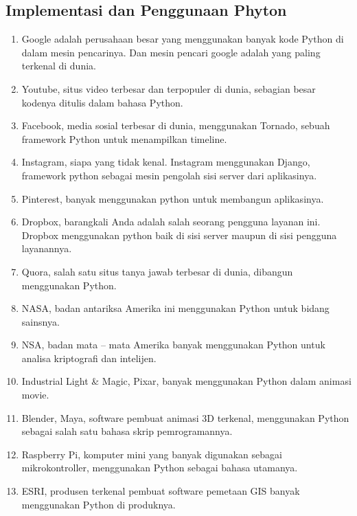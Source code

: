 \documentclass{article}
\begin{document}
\subsection{Implementasi dan Penggunaan Phyton}
\begin{enumerate}
\item
Google adalah perusahaan besar yang menggunakan banyak kode Python di dalam mesin pencarinya. Dan mesin pencari google adalah yang paling terkenal di dunia.
\item
Youtube, situs video terbesar dan terpopuler di dunia, sebagian besar kodenya ditulis dalam bahasa Python.
\item
Facebook, media sosial terbesar di dunia, menggunakan Tornado, sebuah framework Python untuk menampilkan timeline.
\item
Instagram, siapa yang tidak kenal. Instagram menggunakan Django, framework python sebagai mesin pengolah sisi server dari aplikasinya.
\item
Pinterest, banyak menggunakan python untuk membangun aplikasinya.
\item
Dropbox, barangkali Anda adalah salah seorang pengguna layanan ini. Dropbox menggunakan python baik di sisi server maupun di sisi pengguna layanannya.
\item
Quora, salah satu situs tanya jawab terbesar di dunia, dibangun menggunakan Python.
\item
NASA, badan antariksa Amerika ini menggunakan Python untuk bidang sainsnya.
\item
NSA, badan mata – mata Amerika banyak menggunakan Python untuk analisa kriptografi dan intelijen.
\item 
Industrial Light & Magic, Pixar, banyak menggunakan Python dalam animasi movie.
\item
Blender, Maya, software pembuat animasi 3D terkenal, menggunakan Python sebagai salah satu bahasa skrip pemrogramannya.
\item
Raspberry Pi, komputer mini yang banyak digunakan sebagai mikrokontroller, menggunakan Python sebagai bahasa utamanya.
\item
ESRI, produsen terkenal pembuat software pemetaan GIS banyak menggunakan Python di produknya.
\end{enumerate}
\end{document}
